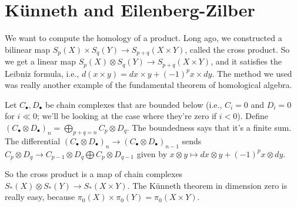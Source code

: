 \section{K\"{u}nneth and Eilenberg-Zilber}
We want to compute the homology of a product. Long ago, we constructed a bilinear map $S_p(X)\times S_q(Y)\to S_{p+q}(X\times Y)$, called the cross product. So we get a linear map $S_p(X)\otimes S_q(Y)\to S_{p+q}(X\times Y)$, and it satisfies the Leibniz formula, i.e., $d(x\times y)=dx\times y+(-1)^px\times dy$. The method we used was really another example of the fundamental theorem of homological algebra.
\begin{definition}
Let $C_\bullet,D_\bullet$ be chain complexes that are bounded below (i.e., $C_i=0$ and $D_i=0$ for $i\ll 0$; we'll be looking at the case where they're zero if $i<0$). Define $(C_\bullet\otimes D_\bullet)_n=\bigoplus_{p+q=n}C_p\otimes D_q$. The boundedness says that it's a finite sum. The differential $(C_\bullet\otimes D_\bullet)_n\to (C_\bullet\otimes D_\bullet)_{n-1}$ sends $C_p\otimes D_q\to C_{p-1}\otimes D_q\bigoplus C_p\otimes D_{q-1}$ given by $x\otimes y\mapsto dx\otimes y+(-1)^p x\otimes dy$.
\end{definition}
So the cross product is a map of chain complexes $S_\ast(X)\otimes S_\ast(Y)\to S_\ast(X\times Y)$. The K\"{u}nneth theorem in dimension zero is really easy, because $\pi_0(X)\times \pi_0(Y)=\pi_0(X\times Y)$.

